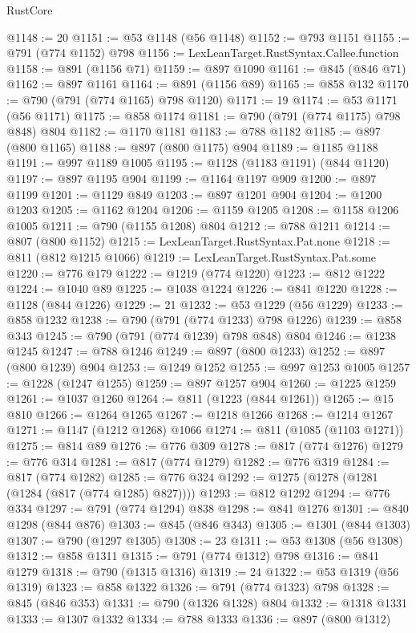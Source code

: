 \begin{lexlean}{RustCore}
\begin{coremodule}
@1148 := 20
@1151 := @53 @1148 (@56 @1148)
@1152 := @793 @1151
@1155 := @791 (@774 @1152) @798
@1156 := LexLeanTarget.RustSyntax.Callee.function
@1158 := @891 (@1156 @71)
@1159 := @897 @1090
@1161 := @845 (@846 @71)
@1162 := @897 @1161
@1164 := @891 (@1156 @89)
@1165 := @858 @132
@1170 := @790 (@791 (@774 @1165) @798 @1120)
@1171 := 19
@1174 := @53 @1171 (@56 @1171)
@1175 := @858 @1174
@1181 := @790 (@791 (@774 @1175) @798 @848) @804
@1182 := @1170 @1181
@1183 := @788 @1182
@1185 := @897 (@800 @1165)
@1188 := @897 (@800 @1175) @904
@1189 := @1185 @1188
@1191 := @997 @1189 @1005
@1195 := @1128 (@1183 @1191) (@844 @1120)
@1197 := @897 @1195 @904
@1199 := @1164 @1197 @909
@1200 := @897 @1199
@1201 := @1129 @849
@1203 := @897 @1201 @904
@1204 := @1200 @1203
@1205 := @1162 @1204
@1206 := @1159 @1205
@1208 := @1158 @1206 @1005
@1211 := @790 (@1155 @1208) @804
@1212 := @788 @1211
@1214 := @807 (@800 @1152)
@1215 := LexLeanTarget.RustSyntax.Pat.none
@1218 := @811 (@812 @1215 @1066)
@1219 := LexLeanTarget.RustSyntax.Pat.some
@1220 := @776 @179
@1222 := @1219 (@774 @1220)
@1223 := @812 @1222
@1224 := @1040 @89
@1225 := @1038 @1224
@1226 := @841 @1220
@1228 := @1128 (@844 @1226)
@1229 := 21
@1232 := @53 @1229 (@56 @1229)
@1233 := @858 @1232
@1238 := @790 (@791 (@774 @1233) @798 @1226)
@1239 := @858 @343
@1245 := @790 (@791 (@774 @1239) @798 @848) @804
@1246 := @1238 @1245
@1247 := @788 @1246
@1249 := @897 (@800 @1233)
@1252 := @897 (@800 @1239) @904
@1253 := @1249 @1252
@1255 := @997 @1253 @1005
@1257 := @1228 (@1247 @1255)
@1259 := @897 @1257 @904
@1260 := @1225 @1259
@1261 := @1037 @1260
@1264 := @811 (@1223 (@844 @1261))
@1265 := @15 @810
@1266 := @1264 @1265
@1267 := @1218 @1266
@1268 := @1214 @1267
@1271 := @1147 (@1212 @1268) @1066
@1274 := @811 (@1085 (@1103 @1271))
@1275 := @814 @89
@1276 := @776 @309
@1278 := @817 (@774 @1276)
@1279 := @776 @314
@1281 := @817 (@774 @1279)
@1282 := @776 @319
@1284 := @817 (@774 @1282)
@1285 := @776 @324
@1292 := @1275 (@1278 (@1281 (@1284 (@817 (@774 @1285) @827))))
@1293 := @812 @1292
@1294 := @776 @334
@1297 := @791 (@774 @1294) @838
@1298 := @841 @1276
@1301 := @840 @1298 (@844 @876)
@1303 := @845 (@846 @343)
@1305 := @1301 (@844 @1303)
@1307 := @790 (@1297 @1305)
@1308 := 23
@1311 := @53 @1308 (@56 @1308)
@1312 := @858 @1311
@1315 := @791 (@774 @1312) @798
@1316 := @841 @1279
@1318 := @790 (@1315 @1316)
@1319 := 24
@1322 := @53 @1319 (@56 @1319)
@1323 := @858 @1322
@1326 := @791 (@774 @1323) @798
@1328 := @845 (@846 @353)
@1331 := @790 (@1326 @1328) @804
@1332 := @1318 @1331
@1333 := @1307 @1332
@1334 := @788 @1333
@1336 := @897 (@800 @1312)

\end{coremodule}
\end{lexlean}
